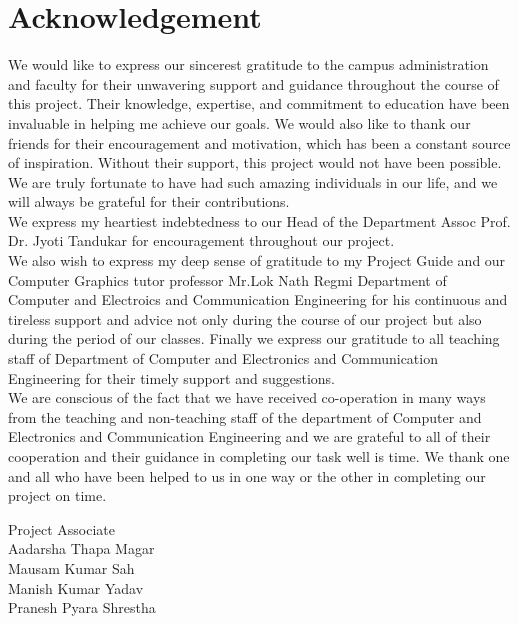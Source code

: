 \documentclass[12pt,a4]{article}
\begin{document}
\section{\Huge{Acknowledgement}}
\large{
We would like to express our sincerest gratitude to the campus administration and faculty for their unwavering support and guidance throughout the course of this project. Their knowledge, expertise, and commitment to education have been invaluable in helping me achieve our goals. We would also like to thank our friends for their encouragement and motivation, which has been a constant source of inspiration. Without their support, this project would not have been possible. We are truly fortunate to have had such amazing individuals in our life, and we will always be grateful for their contributions.\\
We express my heartiest indebtedness to our Head of the Department Assoc
Prof. Dr. Jyoti Tandukar for encouragement throughout our project.\\
We also wish to express my deep sense of gratitude to my Project Guide and our Computer Graphics tutor professor Mr.Lok Nath Regmi Department of Computer and Electroics and Communication Engineering  for his  continuous and tireless support and
advice not only during the course of our project but also during the period of our classes.
Finally we express our gratitude to all teaching staff of Department of Computer and Electronics and Communication Engineering  for
their timely support and suggestions.\\
We are conscious of the fact that we have received co-operation in many ways
from the teaching and non-teaching staff of the department of Computer and Electronics and Communication Engineering  and we are grateful to all of their cooperation and their guidance
in completing our task well is time. We thank one and all who have been helped to us
in one way or the other in completing our project on time.

Project Associate\\
Aadarsha Thapa Magar\\ Mausam Kumar Sah\\ Manish Kumar Yadav\\ Pranesh Pyara Shrestha}
\newpage
\end{document}
